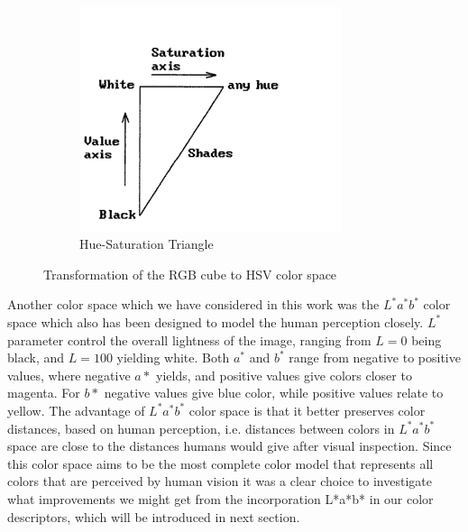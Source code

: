 \documentclass{report}
\begin{document}
\begin{figure}[hbtp]
\begin{subfigure}[b]{0.3\textwidth}
                \label{fig:mouse}
        \end{subfigure}
        ~
        \begin{subfigure}[b]{0.3\textwidth}
                \includegraphics[width=\textwidth]{graphics/hsv_rescale2.png}
                \caption{Hue-Saturation Triangle}
                \label{fig:tiger}
        \end{subfigure}
        \caption{Transformation of the RGB cube to HSV color space}\label{fig:hsv_visualisation}
\end{figure}



Another color space which we have considered in this work was the $L^*a^*b^*$ color space which also has been designed to model the human perception closely. $L^*$ parameter control the overall lightness of the image, ranging from $L=0$ being black, and $L=100$ yielding white. Both $a^*$ and $b^*$ range from negative to positive values, where negative $a*$ yields, and positive values give colors closer to magenta. For $b*$ negative values give blue color, while positive values relate to yellow. The advantage of $L^*a^*b^*$ color space is that it better preserves color distances, based on human perception, i.e. distances between colors in $L^*a^*b^*$ space are close to the distances humans would give after visual inspection. Since this color space aims to be the most complete color model that represents all colors that are perceived by human vision it was a clear choice to investigate what improvements we might get from the incorporation L*a*b* in our color descriptors, which will be introduced in next section.
\end{document}
